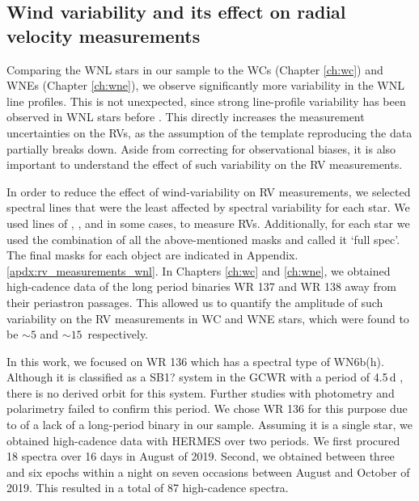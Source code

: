 \subsection{Wind variability and its effect on radial velocity measurements}

Comparing the WNL stars in our sample to the WCs (Chapter \ref{ch:wc}) and WNEs (Chapter \ref{ch:wne}), we observe significantly more variability in the WNL line profiles. This is not unexpected, since strong line-profile variability has been observed in WNL stars before \citep[][]{st-louis_systematic_2009,chene_systematic_2011,2014michaux,2020chene}. This directly increases the measurement uncertainties on the RVs, as the assumption of the template reproducing the data partially breaks down. Aside from correcting for observational biases, it is also important to understand the effect of such variability on the RV measurements.

In order to reduce the effect of wind-variability on RV measurements, we selected spectral lines that were the least affected by spectral variability for each star. We used lines of \heii{}, \niii{}, \niv{} and in some cases, \nv{} to measure RVs. Additionally, for each star we used the combination of all the above-mentioned masks and called it `full spec'. The final masks for each object are indicated in Appendix. \ref{apdx:rv_measurements_wnl}. In Chapters \ref{ch:wc} and \ref{ch:wne}, we obtained high-cadence data of the long period binaries WR 137 and WR 138 away from their periastron passages. This allowed us to quantify the amplitude of such variability on the RV measurements in WC and WNE stars, which were found to be ${\sim}5$ and ${\sim}15$\,\kms{} respectively.

In this work, we focused on WR 136 which has a spectral type of WN6b(h). Although it is classified as a SB1? system in the GCWR with a period of 4.5\,d \citep{koenigsberger_spectral_1980,aslanov_hd_1981}, there is no derived orbit for this system. Further studies with photometry \citep{moffat_photometric_1986} and polarimetry \citep{robert_polarization_1989} failed to confirm this period. We chose WR 136 for this purpose due to of a lack of a long-period binary in our sample. Assuming it is a single star, we obtained high-cadence data with HERMES over two periods. We first procured 18 spectra over 16 days in August of 2019. Second, we obtained between three and six epochs within a night on seven occasions between August and October of 2019. This resulted in a total of 87 high-cadence spectra.

